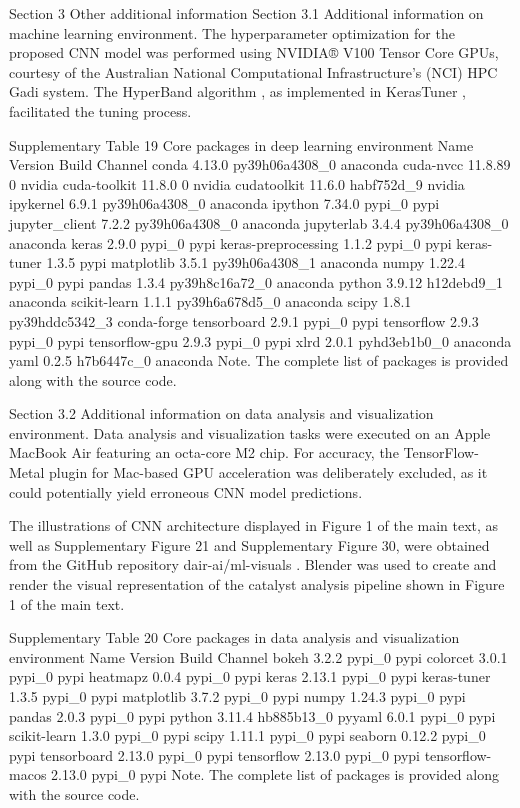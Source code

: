 Section 3 Other additional information
Section 3.1 Additional information on machine learning environment.
The hyperparameter optimization for the proposed CNN model was performed using NVIDIA® V100 Tensor Core GPUs, courtesy of the Australian National Computational Infrastructure's (NCI) HPC Gadi system. The HyperBand algorithm \cite{li2018hyperband}, as implemented in KerasTuner \cite{omalley2019kerastuner} , facilitated the tuning process.

Supplementary Table 19
Core packages in deep learning environment
Name	Version	Build	Channel
conda	4.13.0	py39h06a4308_0	anaconda
cuda-nvcc	11.8.89	0	nvidia
cuda-toolkit	11.8.0	0	nvidia
cudatoolkit	11.6.0	habf752d_9	nvidia
ipykernel	6.9.1	py39h06a4308_0	anaconda
ipython	7.34.0	pypi_0	pypi
jupyter_client	7.2.2	py39h06a4308_0	anaconda
jupyterlab	3.4.4	py39h06a4308_0	anaconda
keras	2.9.0	pypi_0	pypi
keras-preprocessing	1.1.2	pypi_0	pypi
keras-tuner	1.3.5		pypi
matplotlib	3.5.1	py39h06a4308_1	anaconda
numpy	1.22.4	pypi_0	pypi
pandas	1.3.4	py39h8c16a72_0	anaconda
python	3.9.12	h12debd9_1	anaconda
scikit-learn	1.1.1	py39h6a678d5_0	anaconda
scipy	1.8.1	py39hddc5342_3	conda-forge
tensorboard	2.9.1	pypi_0	pypi
tensorflow	2.9.3	pypi_0	pypi
tensorflow-gpu	2.9.3	pypi_0	pypi
xlrd	2.0.1	pyhd3eb1b0_0	anaconda
yaml	0.2.5	h7b6447c_0	anaconda
Note. The complete list of packages is provided along with the source code.

Section 3.2 Additional information on data analysis and visualization environment.
Data analysis and visualization tasks were executed on an Apple MacBook Air featuring an octa-core M2 chip. For accuracy, the TensorFlow-Metal plugin for Mac-based GPU acceleration was deliberately excluded, as it could potentially yield erroneous CNN model predictions.

The illustrations of CNN architecture displayed in Figure 1 of the main text, as well as  Supplementary Figure 21 and Supplementary Figure 30, were obtained from the GitHub repository dair-ai/ml-visuals \cite{Saravia_ML_Visuals_2021}. Blender was used to create and render the visual representation of the catalyst analysis pipeline shown in Figure 1 of the main text.

Supplementary Table 20
Core packages in data analysis and visualization environment
Name	Version	Build	Channel
bokeh	3.2.2	pypi_0	pypi
colorcet	3.0.1	pypi_0	pypi
heatmapz	0.0.4	pypi_0	pypi
keras	2.13.1	pypi_0	pypi
keras-tuner	1.3.5	pypi_0	pypi
matplotlib	3.7.2	pypi_0	pypi
numpy	1.24.3	pypi_0	pypi
pandas	2.0.3	pypi_0	pypi
python	3.11.4	hb885b13_0
pyyaml	6.0.1	pypi_0	pypi
scikit-learn	1.3.0	pypi_0	pypi
scipy	1.11.1	pypi_0	pypi
seaborn	0.12.2	pypi_0	pypi
tensorboard	2.13.0	pypi_0	pypi
tensorflow	2.13.0	pypi_0	pypi
tensorflow-macos	2.13.0	pypi_0	pypi
Note. The complete list of packages is provided along with the source code.
